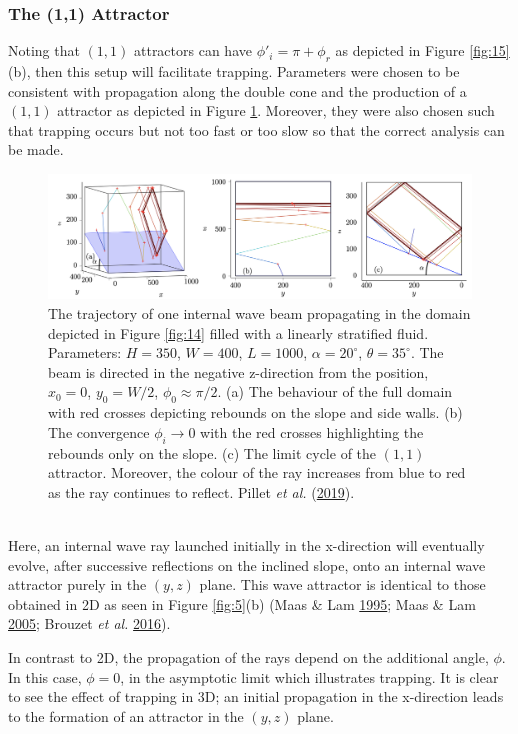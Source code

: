 \documentclass[a4paper]{article}
\numberwithin{equation}{section}
\begin{document}
\subsubsection{The (1,1) Attractor}
Noting that $(1,1)$ attractors can have $\phi'_i = \pi + \phi_r$ as depicted in Figure \ref{fig:15}(b), then this setup will facilitate trapping. Parameters were chosen to be consistent with propagation along the double cone and the production of a $(1,1)$ attractor as depicted in Figure \ref{fig:18}. Moreover, they were also chosen such that trapping occurs but not too fast or too slow so that the correct analysis can be made.
\begin{figure}[h!]
  \includegraphics[scale=0.6, center]{Images/trapping_effect}
  \caption{The trajectory of one internal wave beam propagating in the domain depicted in Figure \ref{fig:14} filled with a linearly stratified fluid. Parameters: $H = 350$, $W = 400$, $L=1000$, $\alpha = 20^{\circ}$, $\theta = 35^{\circ}$. The beam is directed in the negative z-direction from the position, $x_0 = 0$, $y_0 = W/2$, $\phi_0 \approx \pi/2$. (a) The behaviour of the full domain with red crosses depicting rebounds on the slope and side walls. (b) The convergence $\phi_i \rightarrow 0$ with the red crosses highlighting the rebounds only on the slope. (c) The limit cycle of the $(1,1)$ attractor. Moreover, the colour of the ray increases from blue to red as the ray continues to reflect. Pillet \emph{et al.} (\protect\hyperlink{ref 37}{2019}).}
  \label{fig:18}
\end{figure} \\
Here, an internal wave ray launched initially in the x-direction will eventually evolve, after successive reflections on the inclined slope, onto an internal wave attractor purely in the $(y, z)$ plane. This wave attractor is identical to those obtained in 2D as seen in Figure \ref{fig:5}(b) (Maas \& Lam \hyperlink{ref 17}{1995}; Maas \& Lam \hyperlink{ref 10}{2005}; Brouzet \emph{et al.} \hyperlink{ref 26}{2016}).

In contrast to 2D, the propagation of the rays depend on the additional angle, $\phi$. In this case, $\phi = 0$, in the asymptotic limit which illustrates trapping. It is clear to see the effect of trapping in 3D; an initial propagation in the x-direction leads to the formation of an attractor in the $(y, z)$ plane.
\end{document}
